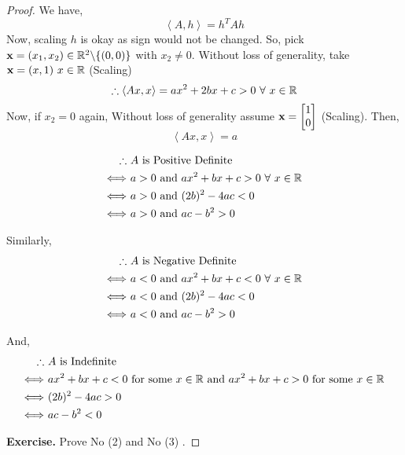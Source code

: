 \documentclass[../Analysis-3]{subfiles}
\begin{document}
\begin{proof}
    We have, \[ \left\langle A, h \right\rangle = h^TAh \]
    Now, scaling $h$ is okay as sign would not be changed. So, pick ${\bf x} = (x_1, x_2) \in \mathbb{R}^2 \backslash \{(0,0)\} $ with $x_2 \neq 0$.
    Without loss of generality, take ${\bf x} = (x,1) \ x \in \mathbb{R}$ (Scaling) \\
    \[ \therefore \left\langle Ax, x \right\rangle = ax^2 + 2bx + c > 0 \ \forall\ x \in \mathbb{R} \]
    Now, if $x_2 = 0$ again, Without loss of generality assume ${\bf x} = \begin{bmatrix}
            1 \\
            0
        \end{bmatrix}$ (Scaling). Then, \[ \left\langle Ax, x \right\rangle = a \]

    \begin{align*}
        \therefore          & \ A \text{ is Positive Definite}                         \\
        \Longleftrightarrow & \ a > 0 \text{ and } ax^2 + bx+c > 0 \ \forall\ x \in \mathbb{R} \\
        \Longleftrightarrow & \ a > 0 \text{ and } (2b)^2 - 4ac < 0                    \\
        \Longleftrightarrow & \ a > 0 \text{ and } ac - b^2 > 0
    \end{align*}

    Similarly,
    \begin{align*}
        \therefore          & \ A \text{ is Negative Definite}                         \\
        \Longleftrightarrow & \ a < 0 \text{ and } ax^2 + bx+c < 0 \ \forall\ x \in \mathbb{R} \\
        \Longleftrightarrow & \ a < 0 \text{ and } (2b)^2 - 4ac < 0                    \\
        \Longleftrightarrow & \ a < 0 \text{ and } ac - b^2 > 0
    \end{align*}

    And,
    \begin{align*}
        \therefore          & \ A \text{ is Indefinite}                                                                              \\
        \Longleftrightarrow & \ ax^2 + bx+c < 0 \ \text{for some } x \in \mathbb{R} \text{ and } ax^2 + bx+c > 0 \ \text{for some } x \in \mathbb{R} \\
        \Longleftrightarrow & \ (2b)^2 - 4ac > 0                                                                                     \\
        \Longleftrightarrow & \ ac - b^2 < 0
    \end{align*}

    \textbf{Exercise.} Prove No (2) and No (3) .
\end{proof}
\end{document}

